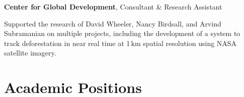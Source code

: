 \documentclass[10pt,letterpaper]{article}
\renewenvironment{itemize}{
  \begin{list}{}{
    \setlength{\leftmargin}{1.5em}
    \setlength{\itemsep}{0.25em}
    \setlength{\parskip}{0pt}
    \setlength{\parsep}{0.25em}
  }
}{
  \end{list}
}
\begin{document}
\begin{itemize}
\item \textbf{Center for Global Development}, Consultant \& Research Assistant %
  \begin{itemize}
  \item Supported the research of David Wheeler, Nancy Birdsall, and Arvind Subramanian on multiple projects, including the development of a system to track deforestation in near real time at 1\,km spatial resolution using NASA satellite imagery.
  \end{itemize}


\end{itemize}

\section*{Academic Positions}
\end{document}
